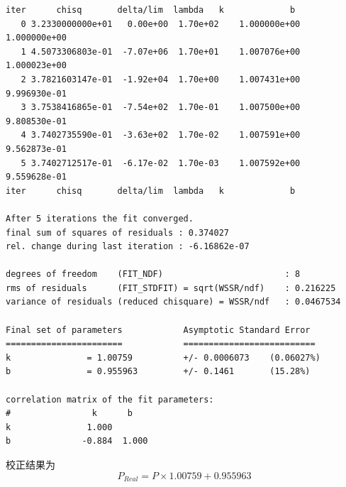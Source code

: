 \documentclass[11pt]{report}
\begin{document}
\begin{verbatim}
iter      chisq       delta/lim  lambda   k             b            
   0 3.2330000000e+01   0.00e+00  1.70e+02    1.000000e+00   1.000000e+00
   1 4.5073306803e-01  -7.07e+06  1.70e+01    1.007076e+00   1.000023e+00
   2 3.7821603147e-01  -1.92e+04  1.70e+00    1.007431e+00   9.996930e-01
   3 3.7538416865e-01  -7.54e+02  1.70e-01    1.007500e+00   9.808530e-01
   4 3.7402735590e-01  -3.63e+02  1.70e-02    1.007591e+00   9.562873e-01
   5 3.7402712517e-01  -6.17e-02  1.70e-03    1.007592e+00   9.559628e-01
iter      chisq       delta/lim  lambda   k             b            

After 5 iterations the fit converged.
final sum of squares of residuals : 0.374027
rel. change during last iteration : -6.16862e-07

degrees of freedom    (FIT_NDF)                        : 8
rms of residuals      (FIT_STDFIT) = sqrt(WSSR/ndf)    : 0.216225
variance of residuals (reduced chisquare) = WSSR/ndf   : 0.0467534

Final set of parameters            Asymptotic Standard Error
=======================            ==========================
k               = 1.00759          +/- 0.0006073    (0.06027%)
b               = 0.955963         +/- 0.1461       (15.28%)

correlation matrix of the fit parameters:
#                k      b      
k               1.000 
b              -0.884  1.000 

\end{verbatim}

校正结果为
\[
    P_{Real}=P\times 1.00759+0.955963
    \]
\end{document}

